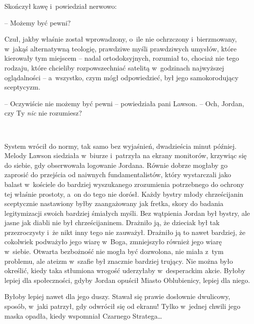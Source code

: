 \documentclass[oneside,polish,11pt,sfheadings]{mwbk}
\begin{document}
Skończył kawę i~powiedział nerwowo: 

-- Możemy być pewni?

Czuł, jakby właśnie został wprowadzony, o~ile nie ochrzczony i~bierzmowany, w~jakąś alternatywną teologię, prawdziwe myśli prawdziwych
umysłów, które kierowały tym miejscem -- nadal ortodoksyjnych, rozumiał
to, chociaż nie tego rodzaju, które chcieliby rozpowszechniać satelitą w~godzinach najwyższej oglądalności -- a~wszyst\-ko, czym mógł odpowiedzieć,
był jego samokorodujący sceptycyzm.

-- Oczywiście nie możemy być pewni -- powiedziała pani Lawson. -- Och,
Jordan, czy Ty \emph{nic} nie rozumiesz?

~

System wrócił do normy, tak samo bez wyjaśnień, dwadzieścia minut
później. Melody Lawson siedziała w~biurze i~patrzyła na ekrany
monitorów, krzywiąc się do siebie, gdy obserwowała logowanie Jordana.
Równie dobrze mogłaby go zaprosić do przejścia od naiwnych
fundamentalistów, który wystarczali jako balast w~kościele do bardziej
wyszukanego zrozumienia potrzebnego do ochrony tej właśnie prostoty, a~on do tego nie dorósł. Każdy bystry młody chrześcijanin sceptycznie
nastawiony byłby zaangażowany jak fretka, skory do badania legitymizacji
swoich bardziej śmiałych myśli. Bez wątpienia Jordan był bystry, ale
jasne jak diabli nie był chrześcijaninem. Drażniło ją, że dzieciak był
tak przezroczysty i~że nikt inny tego nie zauważył. Drażniło ją to nawet
bardziej, że cokolwiek podważyło jego wiarę w~Boga, zmniejszyło również
jego wiarę w~siebie. Otwarta bezbożność nie mogła być dozwolona, nie
miała z~tym problemu, ale ateizm w~szafie był znacznie bardziej trujący.
Nie można było określić, kiedy taka stłumiona wrogość uderzyłaby w~desperackim akcie. Byłoby lepiej dla społeczności, gdyby Jordan opuścił
Miasto Oblubienicy, lepiej dla niego.

Byłoby lepiej nawet dla jego duszy. Stawał się prawie dosłownie
dwulicowy, sposób, w~jaki patrzył, gdy odwrócił się od ekranu! Tylko w~jednej chwili jego maska opadła, kiedy wspomniał Czarnego Stratega\ldots
\end{document}
